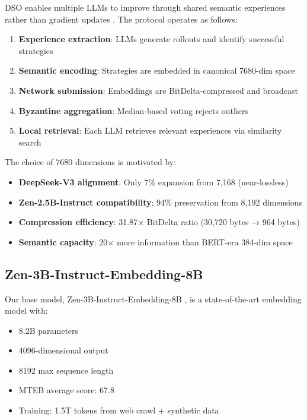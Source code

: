 \documentclass[11pt,letterpaper]{article}
\begin{document}
DSO enables multiple LLMs to improve through shared semantic experiences rather than gradient updates \cite{training_free_grpo2024}. The protocol operates as follows:

\begin{enumerate}
    \item \textbf{Experience extraction}: LLMs generate rollouts and identify successful strategies
    \item \textbf{Semantic encoding}: Strategies are embedded in canonical 7680-dim space
    \item \textbf{Network submission}: Embeddings are BitDelta-compressed and broadcast
    \item \textbf{Byzantine aggregation}: Median-based voting rejects outliers
    \item \textbf{Local retrieval}: Each LLM retrieves relevant experiences via similarity search
\end{enumerate}

The choice of 7680 dimensions is motivated by:
\begin{itemize}
    \item \textbf{DeepSeek-V3 alignment}: Only 7\% expansion from 7,168 (near-lossless)
    \item \textbf{Zen-2.5B-Instruct compatibility}: 94\% preservation from 8,192 dimensions
    \item \textbf{Compression efficiency}: 31.87× BitDelta ratio (30,720 bytes → 964 bytes)
    \item \textbf{Semantic capacity}: 20× more information than BERT-era 384-dim space
\end{itemize}

\subsection{Zen-3B-Instruct-Embedding-8B}

Our base model, Zen-3B-Instruct-Embedding-8B \cite{zenlm2024}, is a state-of-the-art embedding model with:
\begin{itemize}
    \item 8.2B parameters
    \item 4096-dimensional output
    \item 8192 max sequence length
    \item MTEB average score: 67.8
    \item Training: 1.5T tokens from web crawl + synthetic data
\end{itemize}
\end{document}
